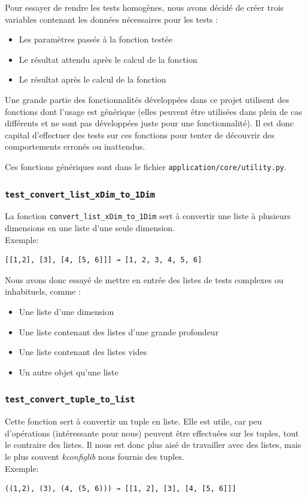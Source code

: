 \documentclass[17pts]{report}
\begin{document}
Pour essayer de rendre les tests homogènes, nous avons décidé de créer trois
variables contenant les données nécessaires pour les tests :
\begin{itemize}
    \item Les paramètres passés à la fonction testée
    \item Le résultat attendu après le calcul de la fonction
    \item Le résultat après le calcul de la fonction
\end{itemize}

Une grande partie des fonctionnalités développées dans ce projet utilisent des
fonctions dont l'usage est générique (elles peuvent être utilisées dans plein
de cas différents et ne sont pas développées juste pour une fonctionnalité). Il
est donc capital d'effectuer des tests sur ces fonctions pour tenter de
découvrir des comportements erronés ou inattendus.

Ces fonctions génériques sont dans le fichier
\verb|application/core/utility.py|.

\subsubsection{\texttt{test\_convert\_list\_xDim\_to\_1Dim}}
\label{ssub:ConvertListXDIMto1DIM}
La fonction \verb|convert_list_xDim_to_1Dim| sert à convertir une liste à
plusieurs dimensions en une liste d'une seule dimension.
\\
Exemple:
\begin{verbatim}
[[1,2], [3], [4, [5, 6]]] → [1, 2, 3, 4, 5, 6]
\end{verbatim}

Nous avons donc essayé de mettre en entrée des listes de tests complexes ou
inhabituels, comme :
\begin{itemize}
    \item Une liste d’une dimension
    \item Une liste contenant des listes d'une grande profondeur
    \item Une liste contenant des listes vides
    \item Un autre objet qu'une liste
\end{itemize}

\subsubsection{\texttt{test\_convert\_tuple\_to\_list}}
\label{ssub:ConvertTupleToList}
Cette fonction sert à convertir un tuple en liste. Elle est utile, car peu
d'opérations (intéressante pour nous) peuvent être effectuées sur les tuples,
tout le contraire des listes. Il nous est donc plus aisé de travailler avec des
listes, mais le plus souvent \textit{kconfiglib} nous fournis des tuples.
\\
Exemple:
\begin{verbatim}
((1,2), (3), (4, (5, 6))) → [[1, 2], [3], [4, [5, 6]]]
\end{verbatim}
\end{document}
